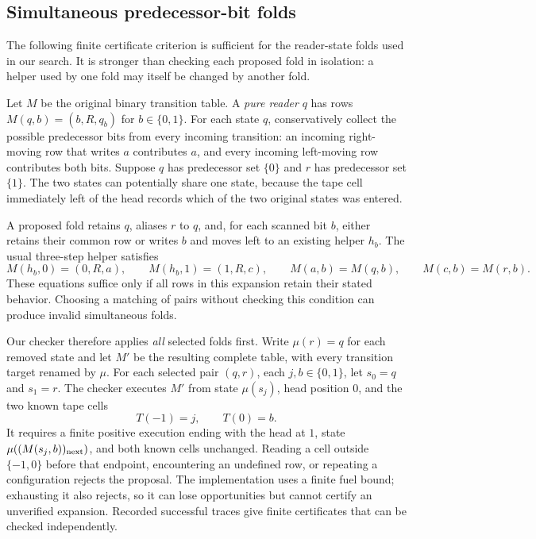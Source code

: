 \subsection{Simultaneous predecessor-bit folds}
\label{sec:simultaneous-folds}

The following finite certificate criterion is sufficient for the reader-state
folds used in our search.  It is stronger than checking each proposed fold in
isolation: a helper used by one fold may itself be changed by another fold.

Let $M$ be the original binary transition table.  A \emph{pure reader} $q$ has
rows $M(q,b)=(b,R,q_b)$ for $b\in\{0,1\}$.  For each state $q$, conservatively
collect the possible predecessor bits from every incoming transition: an
incoming right-moving row that writes $a$ contributes $a$, and every incoming
left-moving row contributes both bits.  Suppose $q$ has predecessor set
$\{0\}$ and $r$ has predecessor set $\{1\}$.  The two states can potentially
share one state, because the tape cell immediately left of the head records
which of the two original states was entered.

A proposed fold retains $q$, aliases $r$ to $q$, and, for each scanned bit $b$,
either retains their common row or writes $b$ and moves left to an existing
helper $h_b$.  The usual three-step helper satisfies
\[
 M(h_b,0)=(0,R,a),\qquad M(h_b,1)=(1,R,c),\qquad
 M(a,b)=M(q,b),\qquad M(c,b)=M(r,b).
\]
These equations suffice only if all rows in this expansion retain their stated
behavior.  Choosing a matching of pairs without checking this condition can
produce invalid simultaneous folds.

Our checker therefore applies \emph{all} selected folds first.  Write
$\mu(r)=q$ for each removed state and let $M'$ be the resulting complete table,
with every transition target renamed by $\mu$.  For each selected pair
$(q,r)$, each $j,b\in\{0,1\}$, let $s_0=q$ and $s_1=r$.  The checker executes
$M'$ from state $\mu(s_j)$, head position $0$, and the two known tape cells
\[
 T(-1)=j,\qquad T(0)=b.
\]
It requires a finite positive execution ending with the head at $1$, state
$\mu((M(s_j,b))_{\rm next})$, and both known cells unchanged.  Reading a cell
outside $\{-1,0\}$ before that endpoint, encountering an undefined row, or
repeating a configuration rejects the proposal.  The implementation uses a
finite fuel bound; exhausting it also rejects, so it can lose opportunities
but cannot certify an unverified expansion.  Recorded successful traces give
finite certificates that can be checked independently.

